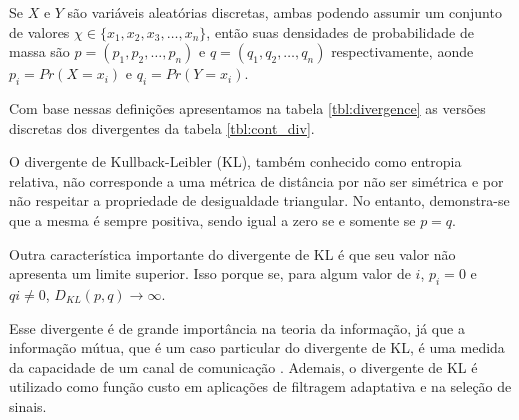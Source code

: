 Se $X\text{ e }Y$ são variáveis aleatórias discretas, ambas podendo assumir um conjunto de valores $\chi \in \{x_{1},x_{2},x_{3},\ldots,x_{n}\}$, então suas densidades de probabilidade de massa são $p = (p_{1},p_{2},\ldots,p_{n})$ e $q = (q_{1},q_{2},\ldots,q_{n})$ respectivamente, aonde $p_i = Pr(X = x_{i})$ e $q_i = Pr(Y = x_{i})$.    

Com base nessas definições apresentamos na tabela \ref{tbl:divergence} as versões discretas dos divergentes da tabela \ref{tbl:cont_div}.

\begin{comment}
From Sample Similarity to Ensemble
Similarity: Probabilistic Distance Measures
in Reproducing Kernel Hilbert Space


Probabilistic distance measures find use in many research
areas such as probability and statistics, pattern recognition,
information theory, communication, and so on. In statistics,
the probabilistic distances are often used in asymptotic
analysis. In pattern recognition, pattern separability is
usually evaluated using probabilistic distance measures [1],
[2] such as Chernoff or Bhattacharyya distances because they
provide bounds for the probability of error. 
\end{comment}




O divergente de Kullback-Leibler (KL), também conhecido como entropia relativa, não corresponde a uma métrica de distância por não ser simétrica e por não respeitar a propriedade de desigualdade triangular. No entanto, demonstra-se que a mesma é sempre positiva, sendo igual a zero se e somente se $p = q$.

Outra característica importante do divergente de KL é que seu valor não apresenta um limite superior. Isso porque se, para algum valor de $i$, $p_{i} = 0$ e $q{i} \neq 0$, $D_{KL}(p,q) \to \infty$.

Esse divergente é de grande importância na teoria da informação, já que a informação mútua, que é um caso particular do divergente de KL, é uma medida da capacidade de um canal de comunicação \cite{Thomas:2006}. Ademais, o divergente de KL é utilizado como função custo em aplicações de filtragem adaptativa e na seleção de sinais.  

